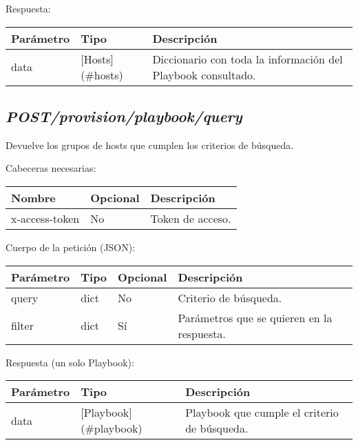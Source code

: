 		Respuesta:
		\begin{table}[h!]
			\centering
	\begin{adjustbox}{max width=\textwidth}
			\begin{tabular}{|l|l|l|}
				\hline
				Parámetro & Tipo & Descripción \\ \hline
				data & [Hosts](\#hosts) & Diccionario con toda la información del Playbook consultado. \\ \hline
			\end{tabular}
\end{adjustbox}
		\end{table}
	
	
	
	\subsection{\textit{POST/provision/playbook/query}}
		Devuelve los grupos de hosts que cumplen los criterios de búsqueda.
		
		Cabeceras necesarias:
		\begin{table}[h!]
			\centering
	\begin{adjustbox}{max width=\textwidth}
			\begin{tabular}{|l|l|l|}
				\hline
				Nombre & Opcional & Descripción \\ \hline
				x-access-token & No & Token de acceso. \\ \hline
			\end{tabular}
\end{adjustbox}
		\end{table}
		
		Cuerpo de la petición (JSON):
		\begin{table}[h!]
			\centering
	\begin{adjustbox}{max width=\textwidth}
			\begin{tabular}{|l|l|l|l|}
				\hline
				Parámetro & Tipo & Opcional & Descripción \\ \hline
				query & dict & No & Criterio de búsqueda. \\ \hline
				filter & dict & Sí & Parámetros que se quieren en la respuesta. \\ \hline
			\end{tabular}
\end{adjustbox}
		\end{table}
		
		Respuesta (un solo Playbook):
		\begin{table}[h!]
			\centering
	\begin{adjustbox}{max width=\textwidth}
			\begin{tabular}{|l|l|l|}
				\hline
				Parámetro & Tipo & Descripción \\ \hline
				data & [Playbook](\#playbook) & Playbook que cumple el criterio de búsqueda. \\ \hline
			\end{tabular}
\end{adjustbox}
		\end{table}
		
